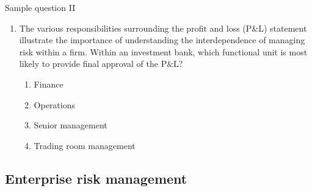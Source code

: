 \begin{frame}{Sample question II}

\begin{enumerate}
	\item The various responsibilities surrounding the profit and loss (P\&L) statement
	illustrate the importance of understanding the interdependence of managing risk
	within a firm. Within an investment bank, which functional unit is most likely to
	provide final approval of the P\&L?
	\begin{enumerate}[A]
		\item Finance
		\item Operations
		\item Senior management
		\item {\color{red} Trading room management}
	\end{enumerate}
\end{enumerate}

\end{frame}

\subsection{Enterprise risk management}



